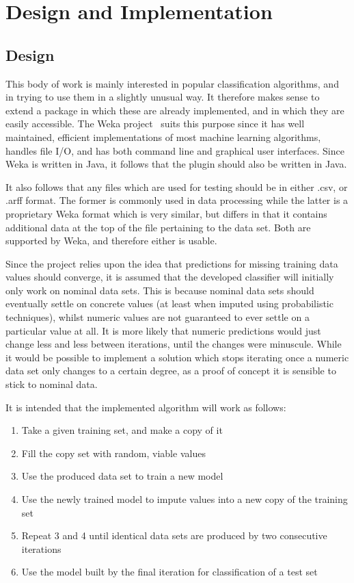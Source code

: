 \newpage
\chapter{Design and Implementation}\label{design_impl}
\section{Design}
\label{design}
This body of work is mainly interested in popular classification algorithms, and in trying to use them in a slightly unusual way. It therefore makes sense to extend a package in which these are already implemented, and in which they are easily accessible. The Weka project~\cite{weka} suits this purpose since it has well maintained, efficient implementations of most machine learning algorithms, handles file I/O, and has both command line and graphical user interfaces. Since Weka is written in Java, it follows that the plugin should also be written in Java.

It also follows that any files which are used for testing should be in either .csv, or .arff format. The former is commonly used in data processing while the latter is a proprietary Weka format which is very similar, but differs in that it contains additional data at the top of the file pertaining to the data set. Both are supported by Weka, and therefore either is usable.

Since the project relies upon the idea that predictions for missing training data values should converge, it is assumed that the developed classifier will initially only work on nominal data sets. This is because nominal data sets should eventually settle on concrete values (at least when imputed using probabilistic techniques), whilst numeric values are not guaranteed to ever settle on a particular value at all. It is more likely that numeric predictions would just change less and less between iterations, until the changes were minuscule. While it would be possible to implement a solution which stops iterating once a numeric data set only changes to a certain degree, as a proof of concept it is sensible to stick to nominal data.

It is intended that the implemented algorithm will work as follows:
\begin{enumerate}
\item Take a given training set, and make a copy of it
\item Fill the copy set with random, viable values
\item Use the produced data set to train a new model
\item Use the newly trained model to impute values into a new copy of the training set
\item Repeat 3 and 4 until identical data sets are produced by two consecutive iterations
\item Use the model built by the final iteration for classification of a test set
\end{enumerate}

